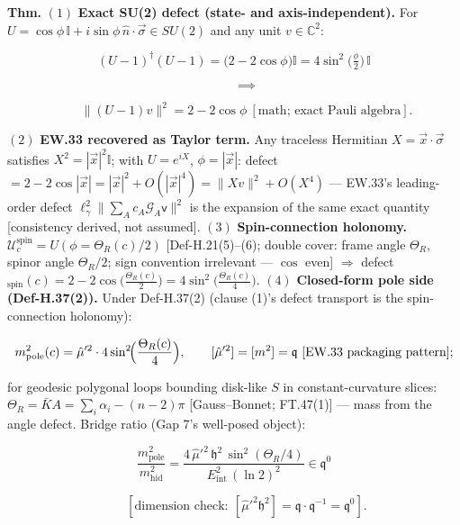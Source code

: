 \begin{theorem}\label{tag:FT-54}
\textbf{Thm.} $(1)$ \textbf{Exact SU(2) defect (state- and axis-independent).} For $U=\cos\phi\,\mathbb I+i\sin\phi\,\hat n\cdot\vec\sigma\in SU(2)$ and any unit $v\in\mathbb C^2$:

\[
(U-1)^\dagger(U-1)=\bigl(2-2\cos\phi\bigr)\mathbb I=4\sin^2\!\bigl(\tfrac\phi2\bigr)\,\mathbb I
\]

\[
\qquad \implies
\]

\[
\qquad \|(U-1)v\|^2=2-2\cos\phi\ [\text{math; exact Pauli algebra}].
\]

$(2)$ \textbf{EW.33 recovered as Taylor term.} Any traceless Hermitian $X=\vec x\cdot\vec\sigma$ satisfies $X^2=|\vec x|^2\mathbb I$; with $U=e^{iX}$, $\phi=|\vec x|$: defect $=2-2\cos|\vec x|=|\vec x|^2+O(|\vec x|^4)=\|Xv\|^2+O(X^4)$ — EW.33's leading-order defect $\ell_\gamma^2\|\sum_Ac_A\mathcal G_A\mathsf v\|^2$ is the expansion of the same exact quantity [consistency derived, not assumed]. $(3)$ \textbf{Spin-connection holonomy.} $\mathcal U^{\mathrm{spin}}_c=U(\phi=\Theta_R(c)/2)$ [Def-H.21(5)–(6); double cover: frame angle $\Theta_R$, spinor angle $\Theta_R/2$; sign convention irrelevant — $\cos$ even] $\Rightarrow$ defect$_{\mathrm{spin}}(c)=2-2\cos\bigl(\tfrac{\Theta_R(c)}{2}\bigr)=4\sin^2\bigl(\tfrac{\Theta_R(c)}{4}\bigr)$. $(4)$ \textbf{Closed-form pole side (Def-H.37(2)).} Under Def-H.37(2) (clause (1)'s defect transport is the spin-connection holonomy):

\[
m_{\mathrm{pole}}^2(c)=\hat\mu'^2\cdot4\sin^2\!\Bigl(\frac{\Theta_R(c)}{4}\Bigr),\qquad[\hat\mu'^2]=[m^2]=\mathfrak q\ [\mathrm{EW.33}\ \text{packaging pattern}];
\]

for geodesic polygonal loops bounding disk-like $S$ in constant-curvature slices: $\Theta_R=\bar KA=\sum_i\alpha_i-(n-2)\pi$ [Gauss–Bonnet; FT.47(1)] — mass from the angle defect. Bridge ratio (Gap 7's well-posed object):

\[
\frac{m_{\mathrm{pole}}^2}{m_{\mathrm{hid}}^2}=\frac{4\,\hat\mu'^2\,\mathfrak h^2\,\sin^2(\Theta_R/4)}{E_{\mathrm{int}}^2\,(\ln2)^2}\in\mathfrak q^0
\]

\[
\qquad [\text{dimension check}:\ [\hat\mu'^2\mathfrak h^2]=\mathfrak q\cdot\mathfrak q^{-1}=\mathfrak q^0].
\]


\end{theorem}

